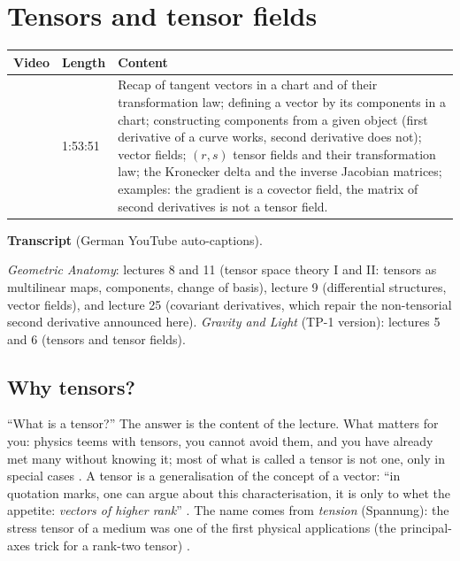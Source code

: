 \chapter{Tensors and tensor fields}\label{ch:c05}
\begin{paracol}{2}

\begin{sources}
\begin{tabularx}{\linewidth}{@{}l l L@{}}
\toprule
\textbf{Video} & \textbf{Length} & \textbf{Content}\\
\midrule
{} & 1:53:51 & Recap of tangent vectors in a chart and of their
transformation law; defining a vector by its components in a chart; constructing components from a given object
(first derivative of a curve works, second derivative does not); vector fields; $(r,s)$ tensor fields and their transformation
law; the Kronecker delta and the inverse Jacobian matrices; examples: the gradient is a covector field, the matrix of second
derivatives is not a tensor field.\\
\bottomrule
\end{tabularx}

\smallskip
\textbf{Transcript}  (German YouTube auto-captions).
\end{sources}

\begin{reading}
\emph{Geometric Anatomy}: lectures 8 and 11 (tensor space theory I and II: tensors as multilinear maps, components,
change of basis), lecture 9 (differential structures, vector fields), and lecture 25 (covariant derivatives, which
repair the non-tensorial second derivative announced here).
\emph{Gravity and Light} (TP-1 version): lectures 5 and 6 (tensors and tensor fields).
\end{reading}

\section{Why tensors?}\label{sec:tf-motivation}

``What is a tensor?'' The answer is the content of the lecture. What matters for you: physics teems with tensors, you
cannot avoid them, and you have already met many without knowing it; most of what is called a tensor is not one, only in
special cases . A tensor is a generalisation of the concept of a vector: ``in quotation marks, one can argue
about this characterisation, it is only to whet the appetite: \emph{vectors of higher rank}'' .
The name comes from \emph{tension} (Spannung): the stress tensor of a medium was one of the first physical applications
(the principal-axes trick for a rank-two tensor) .


\end{paracol}

